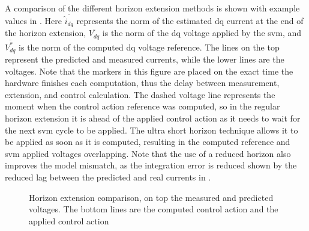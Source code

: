 A comparison of the different horizon extension methods is shown with example values in . Here $\overline{\hat{i}_{dq}}$ represents the norm of the estimated dq current at the end of the horizon extension, $\overline{V_{dq}}$ is the norm of the dq voltage applied by the \gls{svm}, and $\overline{V^*_{dq}}$ is the norm of the computed dq voltage reference. The lines on the top represent the predicted and measured currents, while the lower lines are the voltages. Note that the markers in this figure are placed on the exact time the hardware finishes each computation, thus the delay between measurement, extension, and control calculation. The dashed voltage line represents the moment when the control action reference was computed, so in the regular horizon extension it is ahead of the applied control action as it needs to wait for the next \gls{svm} cycle to be applied. The ultra short horizon technique allows it to be applied as soon as it is computed, resulting in the computed reference and \gls{svm} applied voltages overlapping. Note that the use of a reduced horizon also improves the model mismatch, as the integration error is reduced shown by the reduced lag between the predicted and real currents in .
\begin{figure}[!htb]
	\centering
	\begin{subfigmatrix}{2}
	\end{subfigmatrix}
	\caption{Horizon extension comparison, on top the measured and predicted voltages. The bottom lines are the computed control action and the applied control action}
	\label{fig:hor_comparison}
\end{figure}

